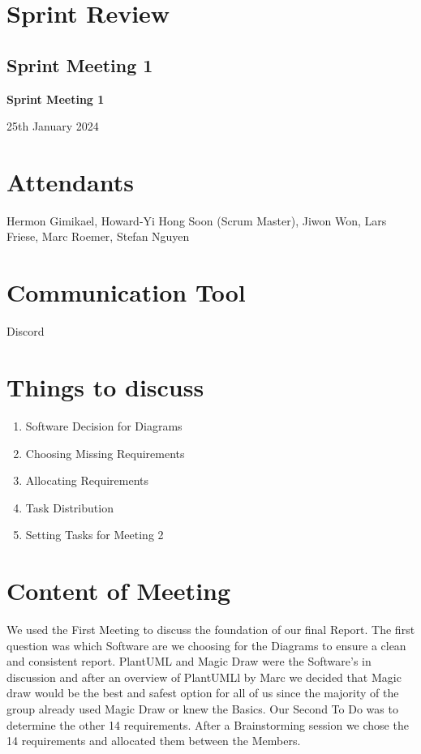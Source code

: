 \documentclass{article}
\begin{document}
\newpage


\section{Sprint Review}
\subsection{Sprint Meeting 1}
\begin{center}
    {\Large \textbf{Sprint Meeting 1}}
    
    \vspace{0.5cm}
    
    {\large 25th January 2024}
\end{center}

\section*{Attendants}
Hermon Gimikael, Howard-Yi Hong Soon (Scrum Master), Jiwon Won, Lars Friese, Marc Roemer, Stefan Nguyen

\section*{Communication Tool}
Discord

\section*{Things to discuss}
\begin{enumerate}
    \item Software Decision for Diagrams
    \item Choosing Missing Requirements
    \item Allocating Requirements
    \item Task Distribution
    \item Setting Tasks for Meeting 2
\end{enumerate}

\section*{Content of Meeting}
We used the First Meeting to discuss the foundation of our final Report. The first question was which Software are we choosing for the Diagrams to ensure a clean and consistent report. PlantUML and Magic Draw were the Software’s in discussion and after an overview of PlantUMLl by Marc we decided that Magic draw would be the best and safest option for all of us since the majority of the group already used Magic Draw or knew the Basics. Our Second To Do was to determine the other 14 requirements. After a Brainstorming session we chose the 14 requirements and allocated them between the Members.
\end{document}
